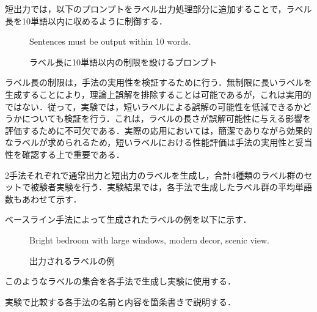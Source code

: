 \documentclass[a4paper,11pt]{jreport}
\begin{document}
短出力では，以下のプロンプトをラベル出力処理部分に追加することで，ラベル長を10単語以内に収めるように制御する．

\begin{figure}[H]
\begin{mdframed}[linewidth=1pt]
Sentences must be output within 10 words.
\end{mdframed}
\caption{ラベル長に10単語以内の制限を設けるプロンプト}
\label{fig:limiting_prompt}
\end{figure}


ラベル長の制限は，手法の実用性を検証するために行う．無制限に長いラベルを生成することにより，理論上誤解を排除することは可能であるが，これは実用的ではない．従って，実験では，短いラベルによる誤解の可能性を低減できるかどうかについても検証を行う．これは，ラベルの長さが誤解可能性に与える影響を評価するために不可欠である．実際の応用においては，簡潔でありながら効果的なラベルが求められるため，短いラベルにおける性能評価は手法の実用性と妥当性を確認する上で重要である．

2手法それぞれで通常出力と短出力のラベルを生成し，合計4種類のラベル群のセットで被験者実験を行う．実験結果では，各手法で生成したラベル群の平均単語数もあわせて示す．

ベースライン手法によって生成されたラベルの例を以下に示す．

\begin{figure}[H]
\begin{mdframed}[linewidth=1pt]
Bright bedroom with large windows, modern decor, scenic view.
\end{mdframed}
\caption{出力されるラベルの例}
\label{fig:label_example}
\end{figure}

このようなラベルの集合を各手法で生成し実験に使用する．

実験で比較する各手法の名前と内容を箇条書きで説明する．
\end{document}
